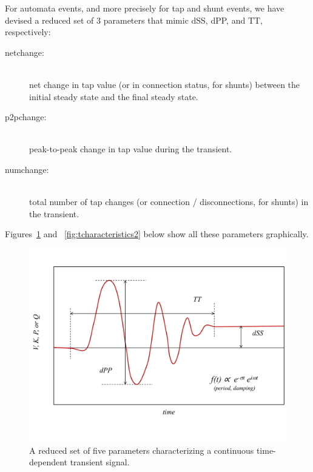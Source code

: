 \documentclass[11pt, a4paper, twoside, titlepage]{article}
\begin{document}
For automata events, and more precisely for tap and shunt events, we have
devised a reduced set of 3 parameters that mimic dSS, dPP, and TT, respectively:

\begin{description}
\item[netchange:] \hfill \\ net change in tap value (or in connection status,
  for shunts) between the initial steady state and the final steady state.
\item[p2pchange:] \hfill \\ peak-to-peak change in tap value during the
  transient.
\item[numchange:] \hfill \\ total number of tap changes (or connection /
  disconnections, for shunts) in the transient.
\end{description}

Figures~\ref{fig:tcharacteristics1} and ~\ref{fig:tcharacteristics2} below show
all these parameters graphically.

\begin{figure}
  \centering
  \includegraphics[width=\columnwidth]{figs/transient_characteristics_1}
  \caption{A reduced set of five parameters characterizing a continuous
    time-dependent transient signal.}
  \label{fig:tcharacteristics1}
\end{figure}
\end{document}
